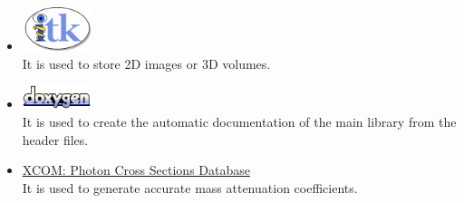 \documentclass[11pt,oneside,a4paper,final]{article}
\begin{document}
\begin{itemize}
 \item \href{http://www.itk.org/}{\includegraphics[width=2cm]{InsightToolkitLogo}}~\cite{itk}\\
 It is used to store \acrshort{2D} images or \acrshort{3D} volumes.

 \item\href{http://www.doxygen.org/}{\includegraphics[width=2cm]{Doxygen}}~\cite{doxygen}\\
It is used to create the automatic documentation of the main library from the header files.

 \item\href{http://physics.nist.gov/PhysRefData/Xcom/Text/download.html}{XCOM: Photon Cross Sections Database}~\cite{XCOM}\\
It is used to generate accurate mass attenuation coefficients.

\end{itemize}

% 
% 
\end{document}
